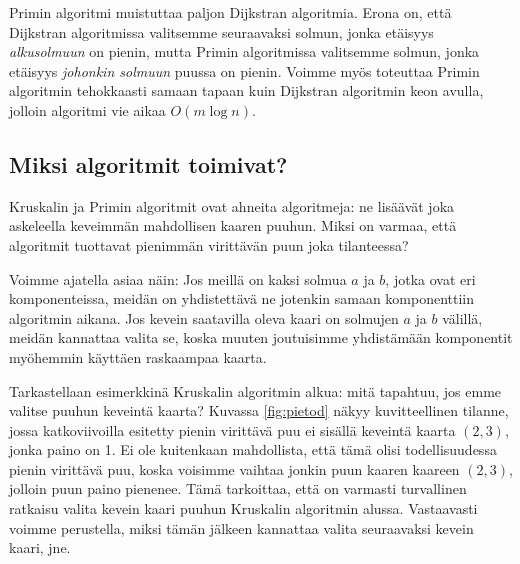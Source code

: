 Primin algoritmi muistuttaa paljon Dijkstran algoritmia.
Erona on, että Dijkstran algoritmissa valitsemme
seuraavaksi solmun, jonka etäisyys \emph{alkusolmuun} on pienin,
mutta Primin algoritmissa valitsemme solmun, jonka etäisyys
\emph{johonkin solmuun} puussa on pienin.
Voimme myös toteuttaa Primin algoritmin tehokkaasti samaan
tapaan kuin Dijkstran algoritmin keon avulla,
jolloin algoritmi vie aikaa $O(m \log n)$.

\subsection{Miksi algoritmit toimivat?}

Kruskalin ja Primin algoritmit ovat ahneita algoritmeja:
ne lisäävät joka askeleella keveimmän mahdollisen kaaren puuhun.
Miksi on varmaa, että algoritmit tuottavat pienimmän virittävän
puun joka tilanteessa?

Voimme ajatella asiaa näin: 
Jos meillä on kaksi solmua $a$ ja $b$, jotka ovat eri komponenteissa,
meidän on yhdistettävä ne jotenkin samaan komponenttiin algoritmin aikana.
Jos kevein saatavilla oleva kaari on solmujen $a$ ja $b$ välillä,
meidän kannattaa valita se, koska muuten joutuisimme yhdistämään komponentit
myöhemmin käyttäen raskaampaa kaarta.

Tarkastellaan esimerkkinä Kruskalin algoritmin alkua:
mitä tapahtuu, jos emme valitse puuhun keveintä kaarta?
Kuvassa \ref{fig:pietod} näkyy kuvitteellinen tilanne,
jossa katkoviivoilla esitetty pienin virittävä puu ei sisällä
keveintä kaarta $(2,3)$, jonka paino on 1.
Ei ole kuitenkaan mahdollista, että tämä olisi todellisuudessa
pienin virittävä puu, koska voisimme vaihtaa jonkin puun kaaren
kaareen $(2,3)$, jolloin puun paino pienenee.
Tämä tarkoittaa, että on varmasti turvallinen ratkaisu valita
kevein kaari puuhun Kruskalin algoritmin alussa.
Vastaavasti voimme perustella, miksi tämän jälkeen kannattaa
valita seuraavaksi kevein kaari, jne.

